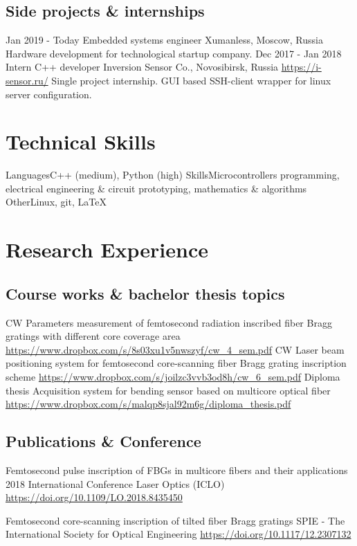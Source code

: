 \documentclass[11pt,a4paper]{moderncv}
\begin{document}
\subsection{Side projects \& internships}
\cventry
  {Jan 2019 - Today}
  {Embedded systems engineer}
  {Xumanless, Moscow, Russia}
  {}{}
  {Hardware development for technological startup company.}
\cventry
  {Dec 2017 - Jan 2018}
  {Intern C++ developer}
  {Inversion Sensor Co., Novosibirsk, Russia}
  {\newline{}\url{https://i-sensor.ru/}}{}
  {Single project internship. GUI based SSH-client wrapper for linux server configuration.}

\section{Technical Skills}
\cvline
  {Languages}{C++ (medium), Python (high)}
\cvline
  {Skills}{Microcontrollers programming, electrical engineering \& circuit prototyping, mathematics \& algorithms}
\cvline
  {Other}{Linux, git, LaTeX}

\section{Research Experience}
  \subsection{Course works \& bachelor thesis topics}
  \cventry
    {CW}
    {Parameters measurement of femtosecond radiation inscribed fiber Bragg gratings with different core coverage area}
    {\newline\url{https://www.dropbox.com/s/8s03xu1v5nwszyf/cw_4_sem.pdf}}{}{}{}
  \cventry
    {CW}
    {Laser beam positioning system for femtosecond core-scanning fiber Bragg grating inscription scheme}
    {\newline\url{https://www.dropbox.com/s/joilzc3vvb3od8h/cw_6_sem.pdf}}{}{}{}
  \cventry
    {Diploma thesis}
    {Acquisition system for bending sensor based on multicore optical fiber}
    {\newline\url{https://www.dropbox.com/s/malqp8sjal92m6g/diploma_thesis.pdf}}{}{}{}
  \subsection{Publications \& Conference}
  \cventry
    {}
    {Femtosecond pulse inscription of FBGs in multicore fibers and their applications}
    {\newline{}2018 International Conference Laser Optics (ICLO)}
    {\newline\url{https://doi.org/10.1109/LO.2018.8435450}}
    {}{}

  \cventry
    {}
    {Femtosecond core-scanning inscription of tilted fiber Bragg gratings}
    {\newline{}SPIE - The International Society for Optical Engineering}
    {\newline\url{https://doi.org/10.1117/12.2307132}}
    {}{}
\end{document}
